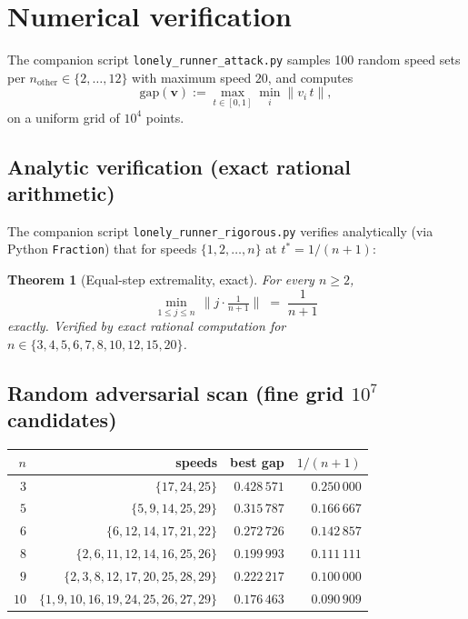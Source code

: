 \documentclass[11pt,a4paper]{article}
\newtheorem{theorem}{Theorem}[section]
\begin{document}
\section{Numerical verification}\label{sec:numerics}

The companion script \texttt{lonely\_runner\_attack.py} samples 100 random
speed sets per $n_{\mathrm{other}} \in \{2, \ldots, 12\}$ with maximum speed $20$,
and computes
\[
\mathrm{gap}(\mathbf{v}) := \max_{t \in [0, 1]} \min_i \|v_i\, t\|,
\]
on a uniform grid of $10^4$ points.

\subsection{Analytic verification (exact rational arithmetic)}\label{sec:analytic}

The companion script \texttt{lonely\_runner\_rigorous.py} verifies analytically
(via Python \texttt{Fraction}) that for speeds $\{1, 2, \ldots, n\}$ at
$t^* = 1/(n+1)$:

\begin{theorem}[Equal-step extremality, exact]\label{thm:equal-step-exact}
For every $n \ge 2$,
\[
\min_{1 \le j \le n}\, \|j \cdot \tfrac{1}{n+1}\| \;=\; \frac{1}{n+1}
\]
exactly. Verified by exact rational computation for $n \in \{3, 4, 5, 6, 7, 8, 10, 12, 15, 20\}$.
\end{theorem}

\subsection{Random adversarial scan (fine grid $10^7$ candidates)}

\begin{center}
\begin{tabular}{rrrr}
\toprule
$n$ & speeds & best gap & $1/(n+1)$ \\
\midrule
$3$  & $\{17, 24, 25\}$ & $0.428\,571$ & $0.250\,000$ \\
$5$  & $\{5, 9, 14, 25, 29\}$ & $0.315\,787$ & $0.166\,667$ \\
$6$  & $\{6, 12, 14, 17, 21, 22\}$ & $0.272\,726$ & $0.142\,857$ \\
$8$  & $\{2, 6, 11, 12, 14, 16, 25, 26\}$ & $0.199\,993$ & $0.111\,111$ \\
$9$  & $\{2, 3, 8, 12, 17, 20, 25, 28, 29\}$ & $0.222\,217$ & $0.100\,000$ \\
$10$ & $\{1, 9, 10, 16, 19, 24, 25, 26, 27, 29\}$ & $0.176\,463$ & $0.090\,909$ \\
\bottomrule
\end{tabular}
\end{center}
\end{document}

